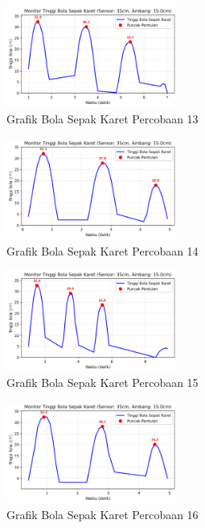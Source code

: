 \begin{figure}[htbp]
    \centering
    \includegraphics[width=0.5\textwidth]{chapters/DataPercobaan/Grafik_Bola_Sepak_Karet_13.png}
    \caption{Grafik Bola Sepak Karet Percobaan 13}
\end{figure}
\begin{figure}[htbp]
    \centering
    \includegraphics[width=0.5\textwidth]{chapters/DataPercobaan/Grafik_Bola_Sepak_Karet_14.png}
    \caption{Grafik Bola Sepak Karet Percobaan 14}
\end{figure}
\begin{figure}[htbp]
    \centering
    \includegraphics[width=0.5\textwidth]{chapters/DataPercobaan/Grafik_Bola_Sepak_Karet_15.png}
    \caption{Grafik Bola Sepak Karet Percobaan 15}
\end{figure}
\begin{figure}[htbp]
    \centering
    \includegraphics[width=0.5\textwidth]{chapters/DataPercobaan/Grafik_Bola_Sepak_Karet_16.png}
    \caption{Grafik Bola Sepak Karet Percobaan 16}
\end{figure}
